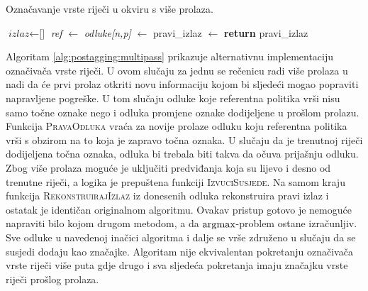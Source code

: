 \begin{algorithm}
\caption{Označavanje vrste riječi u \lts{} okviru s više prolaza.}\label{alg:postagging:multipass}
\begin{algorithmic}[1]
\State $\textit{izlaz} \gets \text{[]}$
    \State \textit{ref} $\gets$ 
    \State \textit{odluke[n,p]} $\gets$ 
  \EndFor
\EndFor
\State pravi\_izlaz $\gets$ 
\State {}
\State \textbf{return} pravi\_izlaz
\EndFunction
\end{algorithmic}
\end{algorithm}

Algoritam \ref{alg:postagging:multipass} prikazuje alternativnu implementaciju
označivača vrste riječi. U ovom slučaju za jednu se rečenicu radi više prolaza u
nadi da će prvi prolaz otkriti novu informaciju kojom bi sljedeći mogao
popraviti napravljene pogreške. U tom slučaju odluke koje referentna politika vrši
nisu samo točne oznake nego i odluka promjene oznake dodijeljene u prošlom
prolazu. Funkcija \textsc{PravaOdluka} vraća za novije prolaze odluku koju
referentna politika vrši s obzirom na to koja je zapravo točna oznaka. U slučaju
da je trenutnoj riječi dodijeljena točna oznaka, odluka bi trebala biti takva da
očuva prijašnju odluku. Zbog više prolaza moguće je uključiti predviđanja koja
su lijevo i desno od trenutne riječi, a logika je prepuštena funkciji
\textsc{IzvuciSusjede}. Na samom kraju funkcija \textsc{RekonstruirajIzlaz} iz
donesenih odluka rekonstruira pravi izlaz i ostatak je identičan originalnom
algoritmu. Ovakav pristup gotovo je nemoguće napraviti bilo kojom drugom
metodom, a da $\operatorname*{argmax}$-problem ostane izračunljiv. Sve odluke u navedenoj
inačici algoritma i dalje se vrše združeno u slučaju da se susjedi dodaju kao
značajke. Algoritam nije ekvivalentan pokretanju označivača vrste riječi više
puta gdje drugo i sva sljedeća pokretanja imaju značajku vrste riječi prošlog
prolaza.
